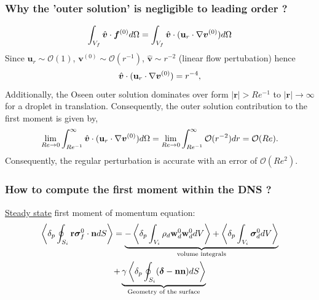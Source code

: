 \documentclass{sintefbeamer}
\begin{document}
\begin{frame}
  \frametitle{Why the 'outer solution' is negligible to leading order ?}
  \begin{equation}
    \int _{V_f}\hat{\bm v} \cdot \bm f^{(0)} d\Omega= \int _{V_f}\hat{\bm v}\cdot(\textbf{u}_r\cdot\grad \bm v^{(0)}) d\Omega
  \end{equation}
  Since $\textbf{u}_r\sim \mathcal{O}(1)$, $\bm v^{(0)}\sim \mathcal{O}(r^{-1})$, $\hat{\bm v} \sim r^{-2}$ (linear flow pertubation) hence 
  \begin{equation}
    \hat{\bm v}\cdot(\textbf{u}_r\cdot\grad \bm v^{(0)}) = r^{-4},
  \end{equation}
  Additionally, the Oseen outer solution dominates over form $|\textbf{r}| > Re^{-1}$ to $|\textbf{r}|\to \infty$ for a droplet in translation.
  Consequently, the outer solution contribution to the first moment is given by, 
  \begin{equation}
      \lim_{Re \to 0 }
      \int_{Re^{-1}}^\infty
      \hat{\bm v}\cdot(\textbf{u}_r\cdot\grad \bm v^{(0)})
      d\Omega
      =
      \lim_{Re \to 0 }
      \int_{Re^{-1}}^\infty
      \mathcal{O}(r^{-2})
      dr
      = \mathcal{O}(Re). 
  \end{equation}
  Consequently, the regular perturbation is accurate with an error of $\mathcal{O}(Re^2)$. 
\end{frame}

\begin{frame}
  \frametitle{How to compute the first moment within the DNS ?}

  \underline{Steady state} first moment of momentum equation:
  \begin{multline*}
    \pSavg[i]{\textbf{r}\bm\sigma_f^0\cdot \textbf{n}}
    = 
    \underbrace{- \pOavg[i]{\rho_d \textbf{w}_d^0  \textbf{w}_d^0 }
    + \pOavg[i]{\bm\sigma_d^0}}_\text{volume integrals}\\
    +  \underbrace{\gamma \pSavg[i]{(\bm\delta - \textbf{nn})}}_\text{Geometry of the surface}
\end{multline*}

\end{frame}
\end{document}
